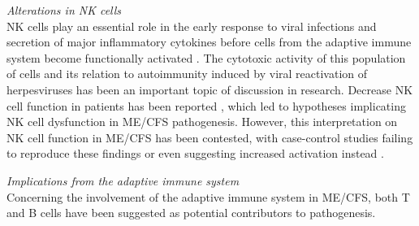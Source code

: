 \bsni
\textit{Alterations in NK cells}\\
\noindent
NK cells play an essential role in the early response to viral infections and secretion of major inflammatory cytokines before cells from the adaptive immune system become functionally activated \citep{janeway2017Immunology}.
The cytotoxic activity of this population of cells and its relation to autoimmunity induced by viral reactivation of herpesviruses has been an important topic of discussion in \cfs research.
Decrease NK cell function in patients has been reported \citep{caligiuri1987PhenotypicFunctional, klimas1990ImmunologicAbnormalitiesa, aoki1993LowNK, fletcher2010BiomarkersChronic, hardcastle2014AnalysisRelationship}, which led to hypotheses implicating NK cell dysfunction in ME/CFS pathogenesis.
However, this interpretation on NK cell function in ME/CFS has been contested, with case-control studies failing to reproduce these findings \citep{theorell2017UnperturbedCytotoxic, cliff2019CellularImmune} or even suggesting increased activation instead \citep{rivasAssociationNKCell2018}.


\bsni
\textit{Implications from the adaptive immune system}\\
\noindent
Concerning the involvement of the adaptive immune system in ME/CFS, both T and B cells have been suggested as potential contributors to pathogenesis.

